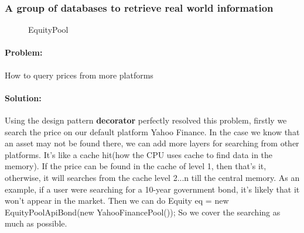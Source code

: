 \documentclass[a4paper,12pt]{report}
\begin{document}
\subsubsection*{A group of databases to retrieve real world information}
\begin{figure}[H]
    \centering{}
    \caption{EquityPool}
    \label{img:EquityPool}
    \end{figure}

    \paragraph{Problem:} How to query prices from more platforms

    \paragraph*{Solution:}Using the design pattern \textbf{decorator} perfectly resolved this problem, firstly we search the price on our default platform Yahoo Finance. In the case we know that an asset may not be found there, we can add more layers for searching from other platforms. It's like a cache hit(how the CPU uses cache to find data in the memory). If the price can be found in the cache of level 1, then that's it, otherwise, it will searches from the cache level 2...n till the central memory. 
    As an example, if a user were searching for a 10-year government bond, it's likely that it won't appear in the market. Then we can do Equity eq = new EquityPoolApiBond(new YahooFinancePool());  So we cover the searching as much as possible.
\end{document}
